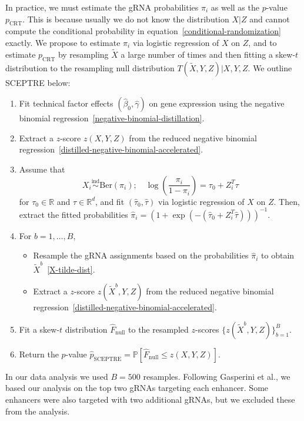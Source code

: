 \documentclass{nature}
\begin{document}
In practice, we must estimate the gRNA probabilities $\pi_i$ as well as the $p$-value $p_{\text{CRT}}$. This is because usually we do not know the distribution $X|Z$ and cannot compute the conditional probability in equation~\eqref{conditional-randomization} exactly. We propose to estimate $\pi_i$ via logistic regression of $X$ on $Z$, and to estimate $p_{\text{CRT}}$ by resampling $\widetilde X$ a large number of times and then fitting a skew-$t$ distribution to the resampling null distribution $T(\widetilde X, Y, Z)|X,Y,Z$. We outline SCEPTRE below: 
\begin{enumerate}
	\item Fit technical factor effects $(\widehat \beta_0,\widehat \gamma)$ on gene expression using the negative binomial regression~\eqref{negative-binomial-distillation}.
	\item Extract a $z$-score $z(X,Y,Z)$ from the reduced negative binomial regression~\eqref{distilled-negative-binomial-accelerated}.
	\item Assume that 
	\begin{equation}
	X_i \overset{\text{ind}}\sim \text{Ber}(\pi_i); \quad \log\left(\frac{\pi_i}{1-\pi_i}\right) = \tau_0 + Z_i^T \tau
	\label{logistic-regression}
	\end{equation}
	for $\tau_0 \in \mathbb R$ and $\tau \in \mathbb R^d$, and fit $(\widehat \tau_0, \widehat \tau)$ via logistic regression of $X$ on $Z$. Then, extract the fitted probabilities $\widehat \pi_i = (1+\exp(-(\widehat \tau_0 + Z_i^T \widehat \tau)))^{-1}$.	
	\item For $b = 1, \dots, B$,
	\begin{itemize}
		\item Resample the gRNA assignments based on the probabilities $\widehat \pi_i$ to obtain $\widetilde X^b$~\eqref{X-tilde-dist}.
		\item Extract a $z$-score $z(\widetilde X^b, Y, Z)$ from the reduced negative binomial regression~\eqref{distilled-negative-binomial-accelerated}.
	\end{itemize}
	\item Fit a skew-$t$ distribution $\widehat F_{\text{null}}$ to the resampled $z$-scores $\{z(\widetilde X^b, Y, Z)\}_{b = 1}^B$. 
	\item Return the $p$-value $\widehat p_{\text{SCEPTRE}} = \mathbb P[\widehat F_{\text{null}} \leq z(X,Y,Z)]$.
\end{enumerate}
In our data analysis we used $B = 500$ resamples. Following Gasperini et al., we based our analysis on the top two gRNAs targeting each enhancer. Some enhancers were also targeted with two additional gRNAs, but we excluded these from the analysis.
\end{document}
